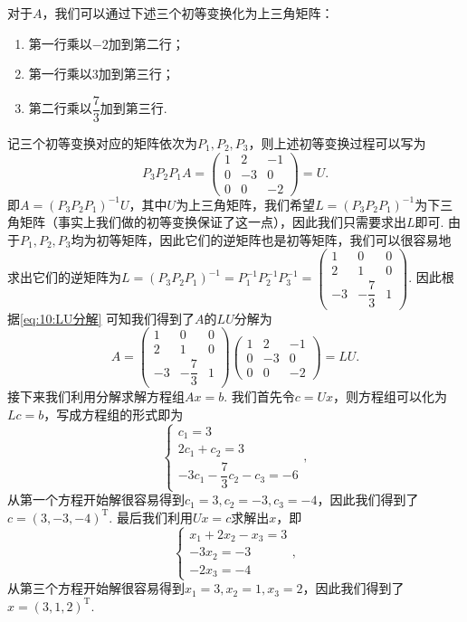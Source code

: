 \begin{solution}
    对于$A$，我们可以通过下述三个初等变换化为上三角矩阵：
    \begin{enumerate}
        \item 第一行乘以$-2$加到第二行；
        \item 第一行乘以$3$加到第三行；
        \item 第二行乘以$\dfrac{7}{3}$加到第三行.
    \end{enumerate}
    记三个初等变换对应的矩阵依次为$P_1,P_2,P_3$，则上述初等变换过程可以写为
    \begin{equation}\label{eq:10:LU分解}
        P_3P_2P_1A=\begin{pmatrix}
            1 & 2 & -1 \\ 0 & -3 & 0 \\ 0 & 0 & -2
        \end{pmatrix}=U.
    \end{equation}
    即$A=(P_3P_2P_1)^{-1}U$，其中$U$为上三角矩阵，我们希望$L=(P_3P_2P_1)^{-1}$为下三角矩阵（事实上我们做的初等变换保证了这一点），因此我们只需要求出$L$即可. 由于$P_1,P_2,P_3$均为初等矩阵，因此它们的逆矩阵也是初等矩阵，我们可以很容易地求出它们的逆矩阵为$L=(P_3P_2P_1)^{-1}=P_1^{-1}P_2^{-1}P_3^{-1}=\begin{pmatrix}
            1 & 0 & 0 \\ 2 & 1 & 0 \\ -3 & -\dfrac{7}{3} & 1
        \end{pmatrix}$. 因此根据\autoref{eq:10:LU分解} 可知我们得到了$A$的$LU$分解为
    \[A=\begin{pmatrix}
            1 & 0 & 0 \\ 2 & 1 & 0 \\ -3 & -\dfrac{7}{3} & 1
        \end{pmatrix}\begin{pmatrix}
            1 & 2 & -1 \\ 0 & -3 & 0 \\ 0 & 0 & -2
        \end{pmatrix}=LU.\]
    接下来我们利用分解求解方程组$Ax=b$. 我们首先令$c=Ux$，则方程组可以化为$Lc=b$，写成方程组的形式即为
    \[\begin{cases}
            c_1=3 \\ 2c_1+c_2=3 \\ -3c_1-\dfrac{7}{3}c_2-c_3=-6
        \end{cases},\]
    从第一个方程开始解很容易得到$c_1=3,c_2=-3,c_3=-4$，因此我们得到了$c=(3,-3,-4)^\mathrm{T}$. 最后我们利用$Ux=c$求解出$x$，即
    \[\begin{cases}
            x_1+2x_2-x_3=3 \\ -3x_2=-3 \\ -2x_3=-4
        \end{cases},\]
    从第三个方程开始解很容易得到$x_1=3,x_2=1,x_3=2$，因此我们得到了$x=(3,1,2)^\mathrm{T}$.
\end{solution}

